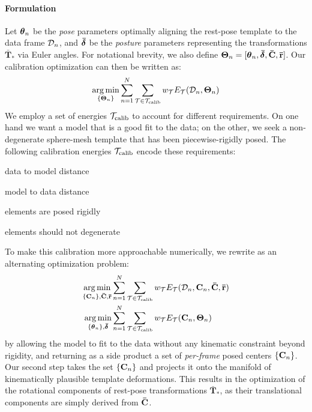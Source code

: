 \paragraph{Formulation}
Let $\boldsymbol{\theta}_n$ be the \emph{pose} parameters optimally aligning the rest-pose template to the data frame $\mathcal{D}_n$, and $\boldsymbol{\bar\delta}$ be the \emph{posture} parameters representing the transformations $\mathbf{\bar{T}}_*$ via Euler angles. For notational brevity, we also define $\boldsymbol{\Theta}_n=[\boldsymbol{\theta}_n, \boldsymbol{\bar\delta}, {\mathbf{\bar{C}}}, {\mathbf{\bar{r}}}]$. Our calibration optimization can then be written as:
% 
\begin{eqnarray}
\operatorname*{arg\,min}_{\{\boldsymbol{\Theta}_n\}}
\sum_{n=1}^N 
\sum_{\mathcal{T} \in {\mathcal{T}_\text{calib}}} 
w_\mathcal{T} E_\mathcal{T}(\mathcal{D}_n, \boldsymbol{\Theta}_n)
\label{eq:calibration}
\end{eqnarray}
% 
We employ a set of energies ${\mathcal{T}_\text{calib}}$ to account for different requirements. On one hand we want a model that is a good fit to the data; on the other, we seek a non-degenerate sphere-mesh template that has been piecewise-rigidly posed. The following calibration energies ${\mathcal{T}_\text{calib}}$ encode these requirements:
% 
\begin{description}[labelsep=0em,labelwidth=.4in,labelindent=1cm,itemsep=-.6em]
\item[d2m] data to model distance
\item[m2d] model to data distance
\item[rigid] elements are posed rigidly
\item[valid] elements should not degenerate
\end{description}
% 
To make this calibration more approachable numerically, we rewrite  as an alternating optimization problem:
% 
\begin{eqnarray}
\operatorname*{arg\,min}_{{\{\mathbf{C}_n\}}, {\mathbf{\bar{C}}}, {\mathbf{\bar{r}}}} &
\sum_{n=1}^N 
\sum_{\mathcal{T} \in {\mathcal{T}_\text{calib}}}
w_\mathcal{T} E_\mathcal{T}(\mathcal{D}_n, {\mathbf{C}}_n, {\mathbf{\bar{C}}}, {\mathbf{\bar{r}}})
\label{eq:step1}
\\
\operatorname*{arg\,min}_{{\{\boldsymbol{\theta}_n\}},\boldsymbol{\bar\delta}} &
\sum_{n=1}^N 
\sum_{\mathcal{T} \in {\mathcal{T}_\text{calib}}}
w_\mathcal{T} E_\mathcal{T}({\mathbf{C}}_n, \boldsymbol{\Theta}_n) 
\end{eqnarray}
% 
 by allowing the model to fit to the data without any kinematic constraint beyond rigidity, and returning as a side product a set of \emph{per-frame} posed centers ${\{\mathbf{C}_n\}}$. 
Our second step takes the set ${\{\mathbf{C}_n\}}$ and projects it onto the manifold of kinematically plausible template deformations. 
This results in the optimization of the rotational components of rest-pose transformations $\mathbf{\bar{T}}_*$, as their translational components are simply derived from ${\mathbf{\bar{C}}}$.


